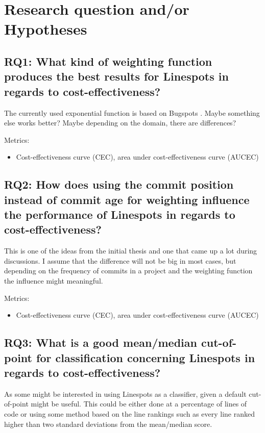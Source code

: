 \section{Research question and/or Hypotheses}

\subsection*{RQ1: What kind of weighting function produces the best results for Linespots in regards to cost-effectiveness?}
\label{sec:rq1}
The currently used exponential function is based on Bugspots \cite{bugspots}. Maybe something else works better? Maybe depending on the domain, there are differences?

Metrics:
\begin{itemize}
    \item Cost-effectiveness curve (CEC), area under cost-effectiveness curve (AUCEC)
\end{itemize}


\subsection{RQ2: How does using the commit position instead of commit age for weighting influence the performance of Linespots in regards to cost-effectiveness?}
\label{sec:rq2}

This is one of the ideas from the initial thesis and one that came up a lot during discussions. I assume that the difference will not be big in most cases, but depending on the frequency of commits in a project and the weighting function the influence might meaningful.

Metrics:
\begin{itemize}
    \item Cost-effectiveness curve (CEC), area under cost-effectiveness curve (AUCEC)
\end{itemize}


\subsection*{RQ3: What is a good mean\slash median cut-of-point for classification concerning Linespots in regards to cost-effectiveness?}
\label{sec:rq3}

As some might be interested in using Linespots as a classifier, given a default cut-of-point might be useful. This could be either done at a percentage of lines of code or using some method based on the line rankings such as every line ranked higher than two standard deviations from the mean\slash median score.

